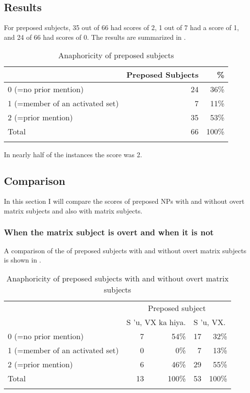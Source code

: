 \documentclass[output=paper
,modfonts
,nonflat]{langsci/langscibook}
\begin{document}
\subsection{\label{s:tsukida:4.2}Results}

For preposed subjects, 35 out of 66 had  scores of 2, 1 out of 7 had a score of 1, and 24 of 66 had scores of 0. The results are summarized in .

\begin{table}
\begin{tabularx}{\textwidth}{Xrr} 
	\lsptoprule
	&  Preposed Subjects &  \%\\
	\midrule
	0 (=no prior mention) &  24 &  36\%\\
	1 (=member of an activated set) &  7 &  11\%\\
	2 (=prior mention) &  35 &  53\%\\
	\midrule
	 Total &  66 &  100\%\\
	\lspbottomrule
\end{tabularx}
	\caption{Anaphoricity of preposed subjects}
	\label{tab:tsukida:6}
\end{table}

\noindent
In nearly half of the instances the score was 2.

\newpage 
\subsection{\label{s:tsukida:4.3}Comparison}

In this section I will compare the  scores of preposed NPs with and without overt matrix subjects and also with matrix subjects.

\subsubsection{\label{s:tsukida:4.3.1}When the matrix subject is overt and when it is not}

A comparison of the  of preposed subjects with and without overt matrix subjects is shown in .

\begin{table}
\begin{tabularx}{\textwidth}{Xrrrr} 
	\lsptoprule
	& \multicolumn{4}{c}{Preposed subject}\\ \cmidrule{2-5}
	& \multicolumn{2}{l}{S 'u, VX ka hiya.} & \multicolumn{2}{l}{S 'u, VX.}\\
	\midrule
	0 (=no prior mention) &  7 &  54\% &  17 &  32\%\\
	1 (=member of an activated set) &  0 &  0\% &  7 &  13\%\\
	2 (=prior mention) &  6 &  46\% &  29 &  55\%\\
	\midrule
	Total &  13 &  100\% &  53 &  100\%\\
	\lspbottomrule
\end{tabularx}
	\caption{Anaphoricity of preposed subjects with and without overt  matrix subjects}
	\label{tab:tsukida:7}
\end{table}
\end{document}
